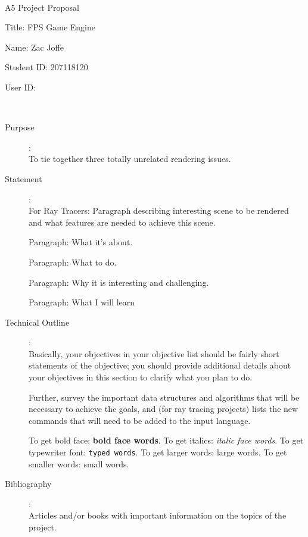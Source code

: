 \documentclass {article}
\begin{document}
~\vfill
\begin{center}
\Large

A5 Project Proposal

Title: FPS Game Engine

Name: Zac Joffe

Student ID: 207118120

User ID:
\end{center}
\vfill ~\vfill~
\newpage
{}
\begin{description}
\item[Purpose]:\\
    To tie together three totally unrelated rendering issues.

\item[Statement]:\\
    For Ray Tracers: Paragraph describing interesting scene to be
        rendered and what features are needed to achieve
        this scene.

    Paragraph: What it's about.

    Paragraph: What to do.

    Paragraph: Why it is interesting and challenging.

    Paragraph: What I will learn

\item[Technical Outline]:\\
    Basically, your objectives in your objective list should be fairly
    short statements of the objective; you should provide additional
    details about your objectives in this section to clarify what you
    plan to do.

     Further, survey the important data structures and algorithms that
     will be necessary to achieve the goals, and (for ray tracing
     projects) lists the new commands
     that will need to be added to the input language.

     To  get  bold face: {\bf bold face words}.  To get italics: {\it italic
     face words}.  To  get typewriter font: {\tt typed words}.  To get
     larger  words:  {\large large  words}.   To  get smaller words:
     {\small small words}.

\item[Bibliography]:\\
     Articles  and/or  books  with  important  information on the
     topics of the project.

\end{description}
\newpage
\end{document}
